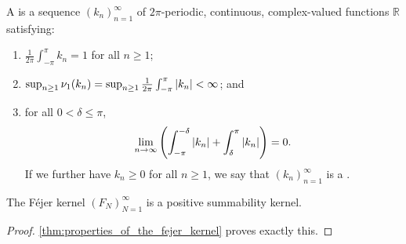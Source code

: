 \documentclass[notoc,notitlepage]{tufte-book}
\begin{document}
\begin{defn}\label{defn:summability_kernel}
  A  is a sequence $(k_n)_{n=1}^{\infty}$
  of $2\pi$-periodic, continuous,
  complex-valued functions $\mathbb{R}$ satisfying:
  \begin{enumerate}
    \item $\frac{1}{2\pi} \int_{-\pi}^{\pi} k_n = 1$  for all $n \geq 1$;
    \item $\sup_{n \geq 1} \nu_1(k_n) = \sup_{n \geq 1} \frac{1}{2\pi}
      \int_{-\pi}^{\pi} \left|k_n\right| < \infty$; and
    \item for all $0 < \delta \leq \pi$,
      \begin{equation*}
        \lim_{n \to \infty} \left(
          \int_{-\pi}^{-\delta} \left|k_n\right|
          + \int_{\delta}^{\pi} \left|k_n\right|
        \right) = 0.
      \end{equation*}
      If we further have $k_n \geq 0$ for all $n \geq 1$,
      we say that $(k_n)_{n=1}^{\infty}$ is a . 
  \end{enumerate}
\end{defn}

\begin{thm}\label{thm:fejer_kernel_as_a_positive_summability_kernel}
  The Féjer kernel $(F_N)_{N=1}^{\infty}$ is a
  positive summability kernel.
\end{thm}

\begin{proof}
  \cref{thm:properties_of_the_fejer_kernel} proves exactly this.
\end{proof}
\end{document}
